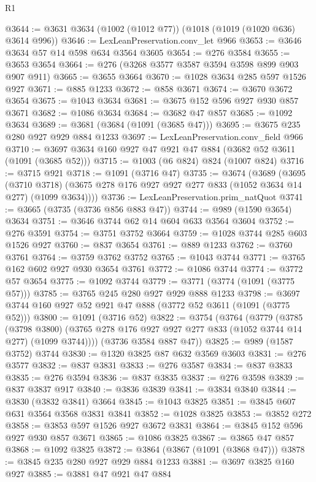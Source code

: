 \begin{lexlean}{R1}
\begin{coremodule}
@3644 := @3631 @3634 (@1002 (@1012 @77)) (@1018 (@1019 (@1020 @636) @3614 @996))
@3646 := LexLeanPreservation.conv_let @966
@3653 := @3646 @3634 @57 @14 @598 @634 @3564 @3605
@3654 := @276 @3584
@3655 := @3653 @3654
@3664 := @276 (@3268 @3577 @3587 @3594 @3598 @899 @903 @907 @911)
@3665 := @3655 @3664
@3670 := @1028 @3634 @285 @597 @1526 @927
@3671 := @885 @1233
@3672 := @858 @3671
@3674 := @3670 @3672 @3654
@3675 := @1043 @3634
@3681 := @3675 @152 @596 @927 @930 @857 @3671
@3682 := @1086 @3634
@3684 := @3682 @47 @857
@3685 := @1092 @3634
@3689 := @3681 (@3684 (@1091 (@3685 @47)))
@3695 := @3675 @235 @280 @927 @929 @884 @1233
@3697 := LexLeanPreservation.conv_field @966
@3710 := @3697 @3634 @160 @927 @47 @921 @47 @884 (@3682 @52 @3611 (@1091 (@3685 @52)))
@3715 := @1003 (@6 @824) @824 (@1007 @824)
@3716 := @3715 @921
@3718 := @1091 (@3716 @47)
@3735 := @3674
    (@3689
      (@3695
        (@3710 @3718)
        (@3675 @278 @176 @927 @927 @277 @833 (@1052 @3634 @14 @277) (@1099 @3634))))
@3736 := LexLeanPreservation.prim_natQuot
@3741 := @3665 (@3735 (@3736 @856 @883 @47))
@3744 := @989 (@1590 @3654) @3634
@3751 := @3646 @3744 @62 @14 @604 @633 @3564 @3604
@3752 := @276 @3591
@3754 := @3751 @3752 @3664
@3759 := @1028 @3744 @285 @603 @1526 @927
@3760 := @837 @3654
@3761 := @889 @1233
@3762 := @3760 @3761
@3764 := @3759 @3762 @3752
@3765 := @1043 @3744
@3771 := @3765 @162 @602 @927 @930 @3654 @3761
@3772 := @1086 @3744
@3774 := @3772 @57 @3654
@3775 := @1092 @3744
@3779 := @3771 (@3774 (@1091 (@3775 @57)))
@3785 := @3765 @245 @280 @927 @929 @888 @1233
@3798 := @3697 @3744 @160 @927 @52 @921 @47 @888 (@3772 @52 @3611 (@1091 (@3775 @52)))
@3800 := @1091 (@3716 @52)
@3822 := @3754
    (@3764
      (@3779
        (@3785
          (@3798 @3800)
          (@3765 @278 @176 @927 @927 @277 @833 (@1052 @3744 @14 @277) (@1099 @3744))))
      (@3736 @3584 @887 @47))
@3825 := @989 (@1587 @3752) @3744
@3830 := @1320 @3825 @87 @632 @3569 @3603
@3831 := @276 @3577
@3832 := @837 @3831
@3833 := @276 @3587
@3834 := @837 @3833
@3835 := @276 @3594
@3836 := @837 @3835
@3837 := @276 @3598
@3839 := @837 @3837 @917
@3840 := @3836 @3839
@3841 := @3834 @3840
@3844 := @3830 (@3832 @3841) @3664
@3845 := @1043 @3825
@3851 := @3845 @607 @631 @3564 @3568 @3831 @3841
@3852 := @1028 @3825
@3853 := @3852 @272
@3858 := @3853 @597 @1526 @927 @3672 @3831
@3864 := @3845 @152 @596 @927 @930 @857 @3671
@3865 := @1086 @3825
@3867 := @3865 @47 @857
@3868 := @1092 @3825
@3872 := @3864 (@3867 (@1091 (@3868 @47)))
@3878 := @3845 @235 @280 @927 @929 @884 @1233
@3881 := @3697 @3825 @160 @927
@3885 := @3881 @47 @921 @47 @884

\end{coremodule}
\end{lexlean}

